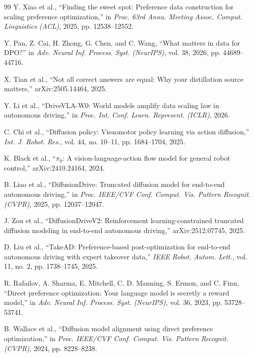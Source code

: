 \documentclass[letterpaper,10pt,conference]{ieeeconf}
\begin{document}
\begin{thebibliography}{99}
Y. Xiao et al., ``Finding the sweet spot: Preference data construction for scaling preference optimization,'' in \emph{Proc. 63rd Annu. Meeting Assoc. Comput. Linguistics (ACL)}, 2025, pp. 12538--12552.

Y. Pan, Z. Cai, H. Zhong, G. Chen, and C. Wang, ``What matters in data for DPO?'' in \emph{Adv. Neural Inf. Process. Syst. (NeurIPS)}, vol. 38, 2026, pp. 44689--44716.

X. Tian et al., ``Not all correct answers are equal: Why your distillation source matters,'' arXiv:2505.14464, 2025.

Y. Li et al., ``DriveVLA-W0: World models amplify data scaling law in autonomous driving,'' in \emph{Proc. Int. Conf. Learn. Represent. (ICLR)}, 2026.

C. Chi et al., ``Diffusion policy: Visuomotor policy learning via action diffusion,'' \emph{Int. J. Robot. Res.}, vol. 44, no. 10--11, pp. 1684--1704, 2025.

K. Black et al., ``$\pi_0$: A vision-language-action flow model for general robot control,'' arXiv:2410.24164, 2024.

B. Liao et al., ``DiffusionDrive: Truncated diffusion model for end-to-end autonomous driving,'' in \emph{Proc. IEEE/CVF Conf. Comput. Vis. Pattern Recognit. (CVPR)}, 2025, pp. 12037--12047.

J. Zou et al., ``DiffusionDriveV2: Reinforcement learning-constrained truncated diffusion modeling in end-to-end autonomous driving,'' arXiv:2512.07745, 2025.

D. Liu et al., ``TakeAD: Preference-based post-optimization for end-to-end autonomous driving with expert takeover data,'' \emph{IEEE Robot. Autom. Lett.}, vol. 11, no. 2, pp. 1738--1745, 2025.

R. Rafailov, A. Sharma, E. Mitchell, C. D. Manning, S. Ermon, and C. Finn, ``Direct preference optimization: Your language model is secretly a reward model,'' in \emph{Adv. Neural Inf. Process. Syst. (NeurIPS)}, vol. 36, 2023, pp. 53728--53741.

B. Wallace et al., ``Diffusion model alignment using direct preference optimization,'' in \emph{Proc. IEEE/CVF Conf. Comput. Vis. Pattern Recognit. (CVPR)}, 2024, pp. 8228--8238.


\end{thebibliography}
\end{document}
